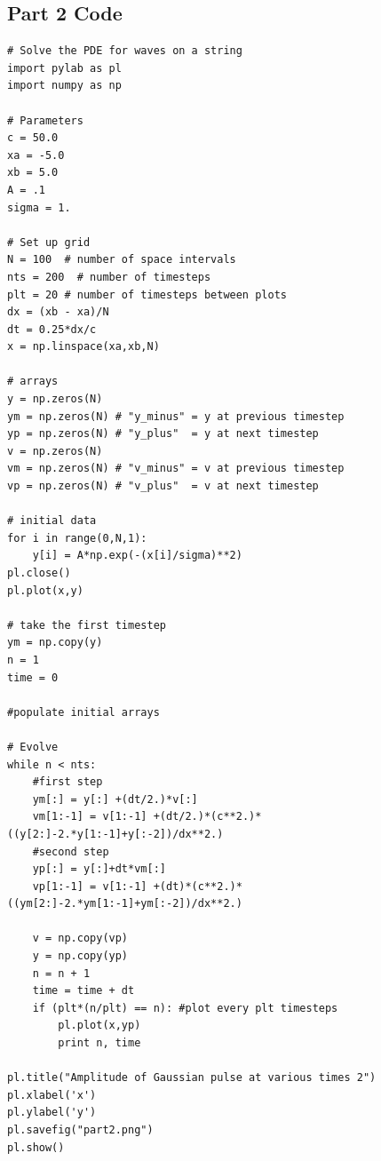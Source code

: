 \documentclass[11pt]{article}
\begin{document}
\subsection{Part 2 Code}
\begin{verbatim}
# Solve the PDE for waves on a string
import pylab as pl
import numpy as np

# Parameters
c = 50.0
xa = -5.0
xb = 5.0
A = .1
sigma = 1.

# Set up grid
N = 100  # number of space intervals
nts = 200  # number of timesteps
plt = 20 # number of timesteps between plots
dx = (xb - xa)/N
dt = 0.25*dx/c
x = np.linspace(xa,xb,N)

# arrays
y = np.zeros(N)
ym = np.zeros(N) # "y_minus" = y at previous timestep
yp = np.zeros(N) # "y_plus"  = y at next timestep
v = np.zeros(N)
vm = np.zeros(N) # "v_minus" = v at previous timestep
vp = np.zeros(N) # "v_plus"  = v at next timestep

# initial data
for i in range(0,N,1):
    y[i] = A*np.exp(-(x[i]/sigma)**2)
pl.close()
pl.plot(x,y)

# take the first timestep
ym = np.copy(y)
n = 1
time = 0

#populate initial arrays

# Evolve
while n < nts:
    #first step
    ym[:] = y[:] +(dt/2.)*v[:]
    vm[1:-1] = v[1:-1] +(dt/2.)*(c**2.)*((y[2:]-2.*y[1:-1]+y[:-2])/dx**2.)
    #second step
    yp[:] = y[:]+dt*vm[:]
    vp[1:-1] = v[1:-1] +(dt)*(c**2.)*((ym[2:]-2.*ym[1:-1]+ym[:-2])/dx**2.)
    
    v = np.copy(vp)
    y = np.copy(yp)
    n = n + 1
    time = time + dt
    if (plt*(n/plt) == n): #plot every plt timesteps
        pl.plot(x,yp)
        print n, time
       
pl.title("Amplitude of Gaussian pulse at various times 2")
pl.xlabel('x')
pl.ylabel('y')
pl.savefig("part2.png")
pl.show()

\end{verbatim}
\end{document}
